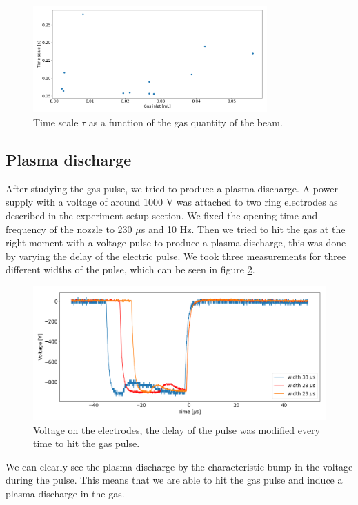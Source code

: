 \documentclass[a4paper,10pt]{article}
\begin{document}
\begin{figure}[H]
\centering
\includegraphics[width = 0.8\textwidth]{gasinlettimescale}
\caption{Time scale $\tau$ as a function of the gas quantity of the beam.}\label{gasinlettimescale}
\end{figure}

\subsection{Plasma discharge}
After studying the gas pulse, we tried to produce a plasma discharge. A power supply with a voltage of around 1000 V was attached to two ring electrodes as described in the experiment setup section. We fixed the opening time and frequency of the nozzle to 230 $\mu$s and 10 Hz. Then we tried to hit the gas at the right moment with a voltage pulse to produce a plasma discharge, this was done by varying the delay of the electric pulse. We took three measurements for three different widths of the pulse, which can be seen in figure \ref{discharge}. 

\begin{figure}[H]
\centering
\includegraphics[width = \textwidth]{discharge}
\caption{Voltage on the electrodes, the delay of the pulse was modified every time to hit the gas pulse.}\label{discharge}
\end{figure}

We can clearly see the plasma discharge by the characteristic bump in the voltage during the pulse. This means that we are able to hit the gas pulse and induce a plasma discharge in the gas.
\end{document}
